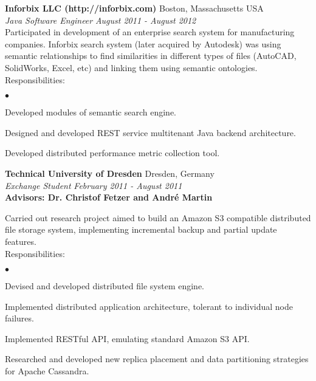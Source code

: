\documentclass[margin,line]{res}
\newenvironment{list2}{
  \begin{list}{$\bullet$}{%
      \setlength{\itemsep}{0in}
      \setlength{\parsep}{0in} \setlength{\parskip}{0in}
      \setlength{\topsep}{0in} \setlength{\partopsep}{0in} 
      \setlength{\leftmargin}{0.2in}}}{\end{list}}
\begin{document}
\begin{resume}
{\bf Inforbix LLC (http://inforbix.com)} \hfill { Boston, Massachusetts USA }\\
{\em Java Software Engineer} \hfill {\it August 2011 - August 2012}\\
Participated in development of an enterprise search system for manufacturing companies. Inforbix search system (later acquired by Autodesk) was using semantic relationships to find similarities in different types of files (AutoCAD, SolidWorks, Excel, etc) and linking them using semantic ontologies.\\
Responsibilities:
\begin{list2}
	\item Developed modules of semantic search engine.
	\item Designed and developed REST service multitenant Java backend architecture.
	\item Developed distributed performance metric collection tool.
\end{list2}

{\bf Technical University of Dresden } \hfill { Dresden, Germany} \\
{\em Exchange Student} \hfill {\it February 2011 - August 2011}\\
{\bf Advisors: Dr. Christof Fetzer and Andr\'e Martin} 

\vspace{-.3cm}
Carried out research project aimed to build an Amazon S3 compatible distributed file storage system, implementing incremental backup and partial update features.\\
Responsibilities:
\begin{list2}
	\item Devised and developed distributed file system engine.%
	\item Implemented distributed application architecture, tolerant to individual node failures.
	\item Implemented RESTful API, emulating standard Amazon S3 API.
	\item Researched and developed new replica placement and data partitioning strategies for Apache Cassandra.
\end{list2}




\end{resume}
\end{document}
